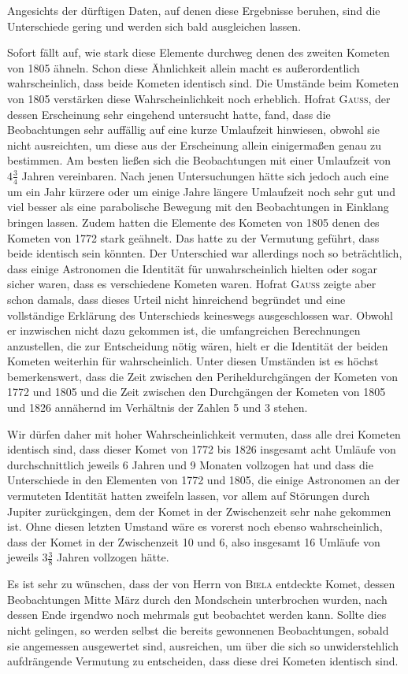 Angesichts der dürftigen Daten, auf denen diese Ergebnisse beruhen, sind die Unterschiede gering und werden sich bald ausgleichen lassen.

Sofort fällt auf, wie stark diese Elemente durchweg denen des zweiten Kometen von 1805 ähneln. Schon diese Ähnlichkeit allein macht es außerordentlich wahrscheinlich, dass beide Kometen identisch sind. Die Umstände beim Kometen von 1805 verstärken diese Wahrscheinlichkeit noch erheblich. Hofrat \textsc{Gauss}, der dessen Erscheinung sehr eingehend untersucht hatte, fand, dass die Beobachtungen sehr auffällig auf eine kurze Umlaufzeit hinwiesen, obwohl sie nicht ausreichten, um diese aus der Erscheinung allein einigermaßen genau zu bestimmen. Am besten ließen sich die Beobachtungen mit einer Umlaufzeit von $4\frac{3}{4}$ Jahren vereinbaren. Nach jenen Untersuchungen hätte sich jedoch auch eine um ein Jahr kürzere oder um einige Jahre längere Umlaufzeit noch sehr gut und viel besser als eine parabolische Bewegung mit den Beobachtungen in Einklang bringen lassen. Zudem hatten die Elemente des Kometen von 1805 denen des Kometen von 1772 stark geähnelt. Das hatte zu der Vermutung geführt, dass beide identisch sein könnten. Der Unterschied war allerdings noch so beträchtlich, dass einige Astronomen die Identität für unwahrscheinlich hielten oder sogar sicher waren, dass es verschiedene Kometen waren. Hofrat \textsc{Gauss} zeigte aber schon damals, dass dieses Urteil nicht hinreichend begründet und eine vollständige Erklärung des Unterschieds keineswegs ausgeschlossen war. Obwohl er inzwischen nicht dazu gekommen ist, die umfangreichen Berechnungen anzustellen, die zur Entscheidung nötig wären, hielt er die Identität der beiden Kometen weiterhin für wahrscheinlich. Unter diesen Umständen ist es höchst bemerkenswert, dass die Zeit zwischen den Periheldurchgängen der Kometen von 1772 und 1805 und die Zeit zwischen den Durchgängen der Kometen von 1805 und 1826 annähernd im Verhältnis der Zahlen 5 und 3 stehen.

Wir dürfen daher mit hoher Wahrscheinlichkeit vermuten, dass alle drei Kometen identisch sind, dass dieser Komet von 1772 bis 1826 insgesamt acht Umläufe von durchschnittlich jeweils 6 Jahren und 9 Monaten vollzogen hat und dass die Unterschiede in den Elementen von 1772 und 1805, die einige Astronomen an der vermuteten Identität hatten zweifeln lassen, vor allem auf Störungen durch Jupiter zurückgingen, dem der Komet in der Zwischenzeit sehr nahe gekommen ist. Ohne diesen letzten Umstand wäre es vorerst noch ebenso wahrscheinlich, dass der Komet in der Zwischenzeit 10 und 6, also insgesamt 16 Umläufe von jeweils $3\frac{3}{8}$ Jahren vollzogen hätte.

Es ist sehr zu wünschen, dass der von Herrn von \textsc{Biela} entdeckte Komet, dessen Beobachtungen Mitte März durch den Mondschein unterbrochen wurden, nach dessen Ende irgendwo noch mehrmals gut beobachtet werden kann. Sollte dies nicht gelingen, so werden selbst die bereits gewonnenen Beobachtungen, sobald sie angemessen ausgewertet sind, ausreichen, um über die sich so unwiderstehlich aufdrängende Vermutung zu entscheiden, dass diese drei Kometen identisch sind.